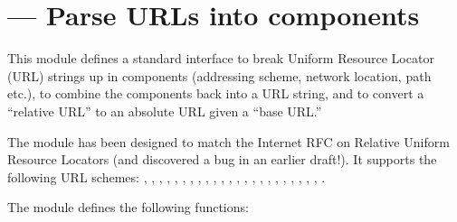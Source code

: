 \section{ ---
         Parse URLs into components}




This module defines a standard interface to break Uniform Resource
Locator (URL) strings up in components (addressing scheme, network
location, path etc.), to combine the components back into a URL
string, and to convert a ``relative URL'' to an absolute URL given a
``base URL.''

The module has been designed to match the Internet RFC on Relative
Uniform Resource Locators (and discovered a bug in an earlier
draft!). It supports the following URL schemes:
, , , , , 
, , , , , 
, , , , , 
, , , , , , 
, , .

The  module defines the following functions:

